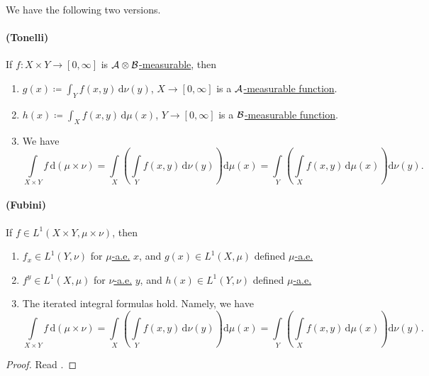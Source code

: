 \begin{theorem}\label{thm:Fubini-Tonelli-theorem}
	We have the following two versions.

	\paragraph{(Tonelli)} If \(f\colon X\times Y\to [0, \infty ]\) is \hyperref[def:A-measurable-function]{\(\mathcal{\MakeUppercase{a}} \otimes \mathcal{\MakeUppercase{b}} \)-measurable},
	then
	\begin{enumerate}
		\item \(g(x)\coloneqq \int_Y f(x, y)\,\mathrm{d} \nu (y)\), \(X\to [0, \infty ]\) is a \hyperref[def:A-measurable-function]{\(\mathcal{\MakeUppercase{a}}\)-measurable function}.
		\item \(h(x)\coloneqq \int_X f(x, y)\,\mathrm{d} \mu (x)\), \(Y\to [0, \infty ]\) is a \hyperref[def:A-measurable-function]{\(\mathcal{\MakeUppercase{b}}\)-measurable function}.
		\item We have
		      \begingroup\makeatletter\def\f@size{8}\check@mathfonts
		      \[
			      \int\limits_{X\times Y} f \,\mathrm{d}(\mu \times \nu ) = \int\limits _X\left(\int\limits _Y f(x, y)\,\mathrm{d}\nu (y)\right)\mathrm{d} \mu (x) = \int\limits _Y\left(\int\limits_X f(x, y)\,\mathrm{d} \mu (x)\right)\mathrm{d} \nu (y).
		      \]
		      \endgroup
	\end{enumerate}

	\paragraph{(Fubini)} If \(f\in L^1(X\times Y, \mu \times \nu )\), then
	\begin{enumerate}
		\item \(f_{x} \in L^1(Y, \nu )\) for \hyperref[def:mu-almost-everywhere]{\(\mu\)-a.e.} \(x\), and \(g(x)\in L^1(X, \mu )\) defined \hyperref[def:mu-almost-everywhere]{\(\mu\)-a.e.}
		\item \(f^{y} \in L^1(X, \mu )\) for \hyperref[def:mu-almost-everywhere]{\(\nu\)-a.e.} \(y\), and \(h(x)\in L^1(Y, \nu )\) defined \hyperref[def:mu-almost-everywhere]{\(\mu\)-a.e.}
		\item The iterated integral formulas hold. Namely, we have
		      \begingroup\makeatletter\def\f@size{8}\check@mathfonts
		      \[
			      \int\limits_{X\times Y} f \,\mathrm{d}(\mu \times \nu ) = \int\limits _X\left(\int\limits _Y f(x, y)\,\mathrm{d}\nu (y)\right)\mathrm{d} \mu (x) = \int\limits _Y\left(\int\limits_X f(x, y)\,\mathrm{d} \mu (x)\right)\mathrm{d} \nu (y).
		      \]
		      \endgroup
	\end{enumerate}
\end{theorem}
\begin{proof}
	Read \cite{folland1999real}.
\end{proof}